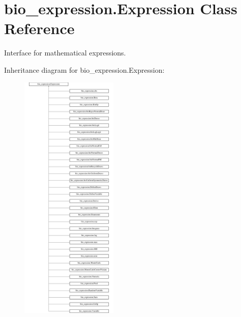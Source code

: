 \hypertarget{classbio__expression_1_1_expression}{}\section{bio\+\_\+expression.\+Expression Class Reference}
\label{classbio__expression_1_1_expression}


Interface for mathematical expressions.  


Inheritance diagram for bio\+\_\+expression.\+Expression\+:\begin{figure}[H]
\begin{center}
\leavevmode
\includegraphics[height=12.000000cm]{classbio__expression_1_1_expression}
\end{center}
\end{figure}
